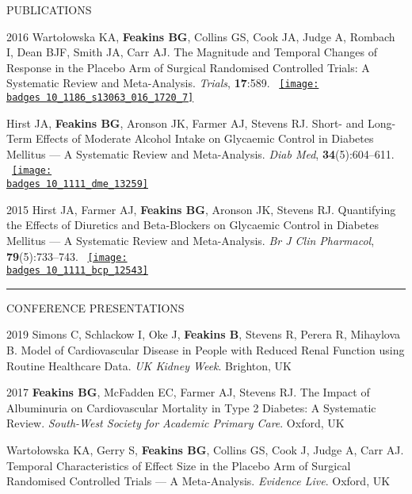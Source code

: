\documentclass[10pt,a4paper]{article}
\def\badges{./badges/}
\begin{document}
\begin{cvlist}{PUBLICATIONS}
	\item[2016]
	Warto\l{}owska KA, \textbf{Feakins BG}, Collins GS, Cook JA, Judge A, Rombach I, Dean BJF, Smith JA, Carr AJ. The Magnitude and Temporal Changes of Response in the Placebo Arm of Surgical Randomised Controlled Trials: A Systematic Review and Meta-Analysis. \textit{Trials}, \textbf{17}:589. ~\href{https://biomedcentral.altmetric.com/details/14679542}{\texttt{[image: \\badges 10\_1186\_s13063\_016\_1720\_7]}}
	
	\item[]
	Hirst JA, \textbf{Feakins BG}, Aronson JK, Farmer AJ, Stevens RJ. Short- and Long-Term Effects of Moderate Alcohol Intake on Glycaemic Control in Diabetes Mellitus --- A Systematic Review and Meta-Analysis. \textit{Diab Med}, \textbf{34}(5):604--611. ~\href{https://wiley.altmetric.com/details/11898077}{\texttt{[image: \\badges 10\_1111\_dme\_13259]}}
	
	\item[2015]
	Hirst JA, Farmer AJ, \textbf{Feakins BG}, Aronson JK, Stevens RJ. Quantifying the Effects of Diuretics and Beta-Blockers on Glycaemic Control in Diabetes Mellitus --- A Systematic Review and Meta-Analysis. \textit{Br J Clin Pharmacol}, \textbf{79}(5):733--743. ~\href{https://wiley.altmetric.com/details/2869563}{\texttt{[image: \\badges 10\_1111\_bcp\_12543]}}
	
\end{cvlist}


\noindent\rule{\textwidth}{0.4pt}
\begin{cvlist}{CONFERENCE PRESENTATIONS}
	
	\item[2019]
	Simons C, Schlackow I, Oke J, \textbf{Feakins B}, Stevens R, Perera R, Mihaylova B. Model of Cardiovascular Disease in People with Reduced Renal Function using Routine Healthcare Data. \textit{UK Kidney Week}. Brighton, UK
	
	\item[2017]
	\textbf{Feakins BG}, McFadden EC, Farmer AJ, Stevens RJ. The Impact of Albuminuria on Cardiovascular Mortality in Type 2 Diabetes: A Systematic Review. \textit{South-West Society for Academic Primary Care}. Oxford, UK
	
	\item[]
	Warto\l{}owska KA, Gerry S, \textbf{Feakins BG}, Collins GS, Cook J, Judge A, Carr AJ. Temporal Characteristics of Effect Size in the Placebo Arm of Surgical Randomised Controlled Trials --- A Meta-Analysis. \textit{Evidence Live}. Oxford, UK
	
\end{cvlist}
\end{document}
